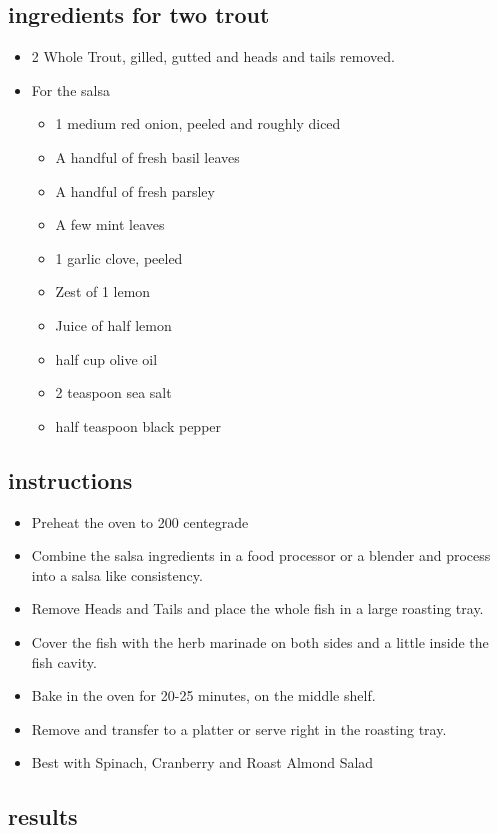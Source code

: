 \subsection*{ingredients for two trout}

\begin{itemize}
\item 2 Whole Trout, gilled, gutted and heads and tails removed.
\item For the salsa
	\begin{itemize}
		\item 1 medium red onion, peeled and roughly diced
		\item A handful of fresh basil leaves
		\item A handful of fresh parsley
		\item A few mint leaves
		\item 1 garlic clove, peeled
		\item Zest of 1 lemon
		\item Juice of half lemon 
		\item half cup olive oil
		\item 2 teaspoon sea salt
		\item half teaspoon black pepper
	\end{itemize}
\end{itemize}

\subsection*{instructions}

\begin{itemize}
	\item Preheat the oven to 200 centegrade
	\item Combine the salsa ingredients in a food processor or a blender and process into a salsa like consistency.
	\item Remove Heads and Tails and place the whole fish in a large roasting tray. 
	\item Cover the fish with the herb marinade on both sides and a little inside the fish cavity. 
	\item Bake in the oven for 20-25 minutes, on the middle shelf. 
	\item Remove and transfer to a platter or serve right in the roasting tray.
	\item Best with Spinach, Cranberry and Roast Almond Salad
\end{itemize}

\subsection*{results}
  
